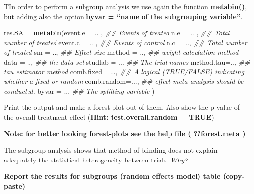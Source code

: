 \documentclass[]{article}
\newenvironment{Shaded}{\begin{snugshade}}{\end{snugshade}}
\newcommand{\CommentTok}[1]{\textcolor[rgb]{0.56,0.35,0.01}{\textit{#1}}}
\newcommand{\DataTypeTok}[1]{\textcolor[rgb]{0.13,0.29,0.53}{#1}}
\newcommand{\KeywordTok}[1]{\textcolor[rgb]{0.13,0.29,0.53}{\textbf{#1}}}
\newcommand{\NormalTok}[1]{#1}
\newcommand{\StringTok}[1]{\textcolor[rgb]{0.31,0.60,0.02}{#1}}
\begin{document}
TIn order to perform a subgroup analysis we use again the function
\textbf{metabin()}, but adding also the option \textbf{byvar = ``name of
the subgrouping variable''}.

\begin{Shaded}
\begin{Highlighting}[]
\NormalTok{res.SA =}\StringTok{ }\KeywordTok{metabin}\NormalTok{(}\DataTypeTok{event.e =}\NormalTok{ .. ,      }\CommentTok{## Events of treated}
                 \DataTypeTok{n.e =}\NormalTok{ .. ,          }\CommentTok{## Total number of treated}
                 \DataTypeTok{event.c =}\NormalTok{ .. ,      }\CommentTok{## Events of control}
                 \DataTypeTok{n.c =}\NormalTok{ ..,           }\CommentTok{## Total number of treated}
                 \DataTypeTok{sm =}\NormalTok{ ..,            }\CommentTok{## Effect size}
                 \DataTypeTok{method =}\NormalTok{ ..,        }\CommentTok{## weight calculation method}
                 \DataTypeTok{data =}\NormalTok{ ..,          }\CommentTok{## the data-set}
                 \DataTypeTok{studlab =}\NormalTok{ ..,       }\CommentTok{## The trial names}
                 \DataTypeTok{method.tau=}\NormalTok{..,      }\CommentTok{## tau estimator method}
                 \DataTypeTok{comb.fixed =}\NormalTok{...,    }\CommentTok{## A logical (TRUE/FALSE) indicating whether a fixed or random  }
                 \DataTypeTok{comb.random=}\NormalTok{...,    }\CommentTok{## effect meta-analysis should be conducted.}
                 \DataTypeTok{byvar =}\NormalTok{ ...         }\CommentTok{## The splitting variable  }
\NormalTok{                 )}
\end{Highlighting}
\end{Shaded}

Print the output and make a forest plot out of them. Also show the
p-value of the overall treatment effect (\textbf{Hint:
test.overall.random = TRUE})

\textbf{Note: for better looking forest-plots see the help file (
??forest.meta )}

The subgroup analysis shows that method of blinding does not explain
adequately the statistical heterogeneity between trials. \emph{Why?}

\textbf{Report the results for subgroups (random effects model) table
(copy-paste)}

\newline 

\newline 
\end{document}
